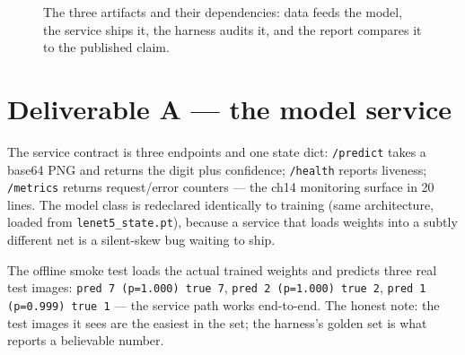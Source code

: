 \begin{figure}[htbp]
\centering
{}
\caption{The three artifacts and their dependencies: data feeds the
model, the service ships it, the harness audits it, and the report
compares it to the published claim.}
\label{fig:capsys}
\end{figure}

\section{Deliverable A --- the model service}
\label{sec:service}

The service contract is three endpoints and one state dict:
\texttt{/predict} takes a base64 PNG and returns the digit plus
confidence; \texttt{/health} reports liveness; \texttt{/metrics}
returns request/error counters --- the ch14 monitoring surface in
20 lines. The model class is redeclared identically to training
(same architecture, loaded from \texttt{lenet5\_state.pt}), because
a service that loads weights into a subtly different net is a
silent-skew bug waiting to ship.





\begin{example}
\label{ex:service}
The offline smoke test loads the actual trained weights and
predicts three real test images: \texttt{pred 7 (p=1.000) true 7},
\texttt{pred 2 (p=1.000) true 2}, \texttt{pred 1 (p=0.999) true 1}
--- the service path works end-to-end. The honest note: the test
images it sees are the easiest in the set; the harness's golden set
is what reports a believable number.
\end{example}

